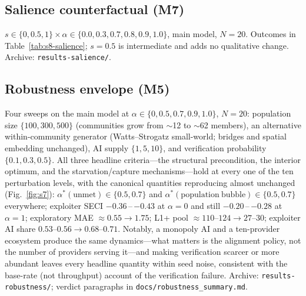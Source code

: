 \documentclass[11pt]{article}
\begin{document}
\subsection{Salience counterfactual (M7)}
$s \in \{0, 0.5, 1\} \times \alpha \in \{0.0, 0.3, 0.7, 0.8, 0.9,
1.0\}$, main model, $N = 20$. Outcomes in Table~\ref{tab:s8-salience};
$s = 0.5$ is intermediate and adds no qualitative change. Archive:
\texttt{results-salience/}.

\subsection{Robustness envelope (M5)}
Four sweeps on the main model at $\alpha \in \{0, 0.5, 0.7, 0.9, 1.0\}$,
$N = 20$: population size $\{100, 300, 500\}$ (communities grow from
$\sim$12 to $\sim$62 members), an alternative within-community generator
(Watts--Strogatz small-world; bridges and spatial embedding unchanged),
AI supply $\{1, 5, 10\}$, and verification probability
$\{0.1, 0.3, 0.5\}$. All three headline criteria---the structural
precondition, the interior optimum, and the starvation/capture
mechanisms---hold at every one of the ten perturbation levels, with the
canonical quantities reproducing almost unchanged
(Fig.~\ref{fig:s7}): $\alpha^{*}(\mathrm{unmet}) \in \{0.5, 0.7\}$ and
$\alpha^{*}(\mathrm{population\ bubble}) \in \{0.5, 0.7\}$ everywhere;
exploiter SECI $-0.36$\,--\,$-0.43$ at $\alpha=0$ and still
$-0.20$\,--\,$-0.28$ at $\alpha=1$; exploratory MAE $\approx 0.55 \to
1.75$; L1+ pool $\approx 110$--$124 \to 27$--$30$; exploiter AI share
$0.53$--$0.56 \to 0.68$--$0.71$. Notably, a monopoly AI and a
ten-provider ecosystem produce the same dynamics---what matters is the
alignment policy, not the number of providers serving it---and making
verification scarcer or more abundant leaves every headline quantity
within seed noise, consistent with the base-rate (not throughput)
account of the verification failure. Archive:
\texttt{results-robustness/}; verdict paragraphs in
\texttt{docs/robustness\_summary.md}.
\end{document}
